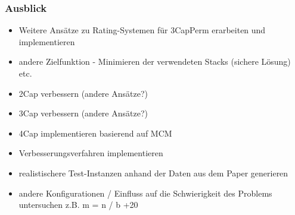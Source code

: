 \documentclass{beamer}
\begin{document}
\begin{frame}
\frametitle{Ausblick}
\begin{itemize}
  \item Weitere Ansätze zu Rating-Systemen für 3CapPerm erarbeiten und implementieren
  \item andere Zielfunktion - Minimieren der verwendeten Stacks (sichere Lösung) etc.
  \item 2Cap verbessern (andere Ansätze?)
  \item 3Cap verbessern (andere Ansätze?)
  \item 4Cap implementieren basierend auf MCM
  \item Verbesserungsverfahren implementieren
  \item realistischere Test-Instanzen anhand der Daten aus dem Paper generieren
  \item andere Konfigurationen / Einfluss auf die Schwierigkeit des Problems untersuchen z.B. m = n / b +20%
\end{itemize}
\end{frame}



\end{document}
